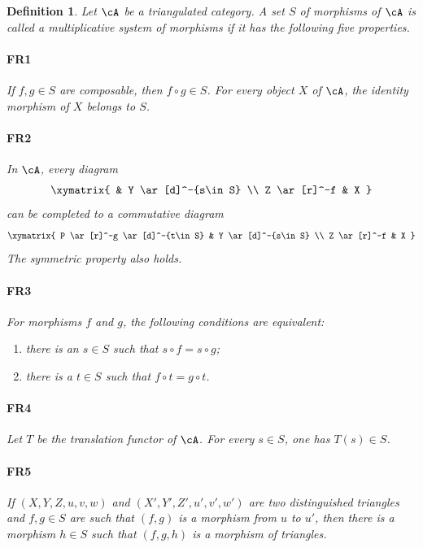 \documentclass[12pt,oneside,english]{smfbook}
\newtheorem{definition}[subsubsection]{Definition}
\begin{document}
\begin{definition}
Let $\cA$ be a triangulated category. A set $S$ of morphisms of $\cA$ is called a \emph{multiplicative system of morphisms} if it has the following five properties.

\paragraph{FR1}
\hypertarget{VIII:FR1}{} If $f,g\in S$ are composable, then $f\circ g\in S$. For every object $X$ of $\cA$, the identity morphism of $X$ belongs to $S$.

\paragraph{FR2}
\hypertarget{VIII:FR2}{} In $\cA$, every diagram
\[\xymatrix{
  & Y \ar[d]^-{s\in S} \\
  Z \ar[r]^-f
    & X
}\]
can be completed to a commutative diagram
\[\xymatrix{
  P \ar[r]^-g \ar[d]^-{t\in S}
    & Y \ar[d]^-{s\in S} \\
  Z \ar[r]^-f
    & X
}\]
The symmetric property also holds.

\paragraph{FR3}
\hypertarget{VIII:FR3}{} For morphisms $f$ and $g$, the following conditions are equivalent:
\begin{enumerate}[\indent i)]
  \item there is an $s\in S$ such that $s\circ f=s\circ g$;
  \item there is a $t\in S$ such that $f\circ t=g\circ t$.
\end{enumerate}

\paragraph{FR4}
\hypertarget{VIII:FR4}{} Let $T$ be the translation functor of $\cA$. For every $s\in S$, one has $T(s)\in S$.

\paragraph{FR5}
\hypertarget{VIII:FR5}{} If $(X,Y,Z,u,v,w)$ and $(X',Y',Z',u',v',w')$ are two distinguished triangles and $f,g\in S$ are such that $(f,g)$ is a morphism from $u$ to $u'$, then there is a morphism $h\in S$ such that $(f,g,h)$ is a morphism of triangles.
\end{definition}
\end{document}
